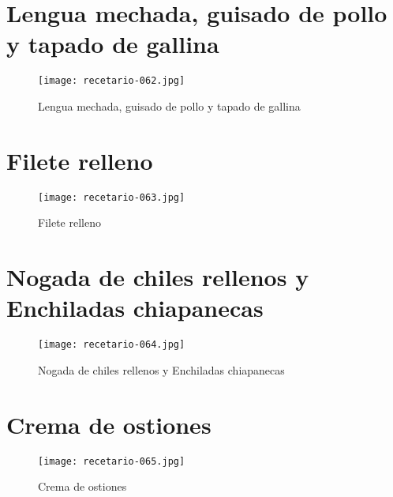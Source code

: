 \documentclass[12pt,letterpaper]{article}
\begin{document}
\newpage

\section{Lengua mechada, guisado de pollo y tapado de gallina}
  \begin{figure}[H]
    \vspace{2pt}
  \texttt{[image: recetario-062.jpg]}
    \caption{Lengua mechada, guisado de pollo y tapado de gallina}
    
  \end{figure}


\newpage

\section{Filete relleno}
  \begin{figure}[H]
    \vspace{2pt}
  \texttt{[image: recetario-063.jpg]}
    \caption{Filete relleno}
    
  \end{figure}

\newpage

\section{Nogada de chiles rellenos y Enchiladas chiapanecas}
  \begin{figure}[H]
    \vspace{2pt}
  \texttt{[image: recetario-064.jpg]}
    \caption{Nogada de chiles rellenos y Enchiladas chiapanecas}
    
  \end{figure}

\newpage

\section{Crema de ostiones}
  \begin{figure}[H]
    \vspace{2pt}
  \texttt{[image: recetario-065.jpg]}
    \caption{Crema de ostiones}
    
  \end{figure}
\end{document}
